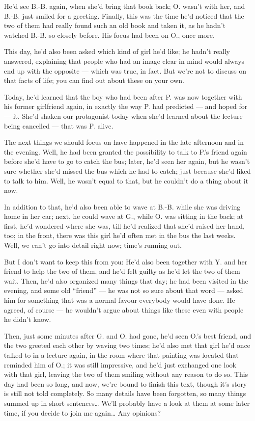 He'd see B.-B. again, when she'd bring that book back; O. wasn't with her, and B.-B. just smiled for a greeting. Finally, this was the time he'd noticed that the two of them had really found such an old book and taken it, as he hadn't watched B.-B. so closely before. His focus had been on O., once more.

This day, he'd also been asked which kind of girl he'd like; he hadn't really answered, explaining that people who had an image clear in mind would always end up with the opposite --- which was true, in fact.
But we're not to discuss on that facts of life; you can find out about these on your own.

Today, he'd learned that the boy who had been after P. was now together with his former girlfriend again, in exactly the way P. had predicted --- and hoped for --- it. She'd shaken our protagonist today when she'd learned about the lecture being cancelled --- that was P. alive.

The next things we should focus on have happened in the late afternoon and in the evening. Well, he had been granted the possibility to talk to P.'s friend again before she'd have to go to catch the bus; later, he'd seen her again, but he wasn't sure whether she'd missed the bus which he had to catch; just because she'd liked to talk to him. Well, he wasn't equal to that, but he couldn't do a thing about it now.

In addition to that, he'd also been able to wave at B.-B. while she was driving home in her car; next, he could wave at G., while O. was sitting in the back; at first, he'd wondered where she was, till he'd realized that she'd raised her hand, too; in the front, there was this girl he'd often met in the bus the last weeks.
Well, we can't go into detail right now; time's running out.

But I don't want to keep this from you: He'd also been together with Y. and her friend to help the two of them, and he'd felt guilty as he'd let the two of them wait. Then, he'd also organized many things that day; he had been visited in the evening, and some old \enquote{friend} --- he was not so sure about that word --- asked him for something that was a normal favour everybody would have done. He agreed, of course --- he wouldn't argue about things like these even with people he didn't know.

Then, just some minutes after G. and O. had gone, he'd seen O.'s best friend, and the two greeted each other by waving two times; he'd also met that girl he'd once talked to in a lecture again, in the room where that painting was located that reminded him of O.; it was still impressive, and he'd just exchanged one look with that girl, leaving the two of them smiling without any reason to do so. 
This day had been so long, and now, we're bound to finish this text, though it's story is still not told completely. So many details have been forgotten, so many things summed up in short sentences\dots{}
We'll probably have a look at them at some later time, if you decide to join me again\dots{}
Any opinions?

